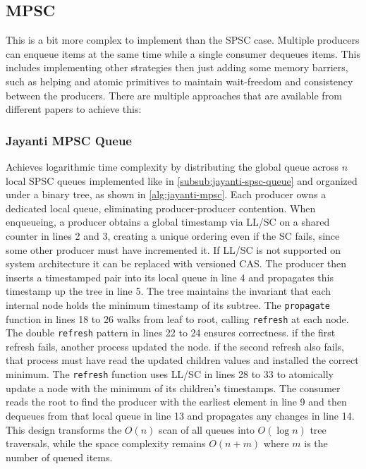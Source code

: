 \subsection{\acf{MPSC}}\label{subsec:multiple-producer-and-single-consumer}
This is a bit more complex to implement than the \ac{SPSC} case. Multiple producers can enqueue items at the same time while a single consumer dequeues items. This includes implementing other strategies then just adding some memory barriers, such as helping and atomic primitives to maintain wait-freedom and consistency between the producers. There are multiple approaches that are available from different papers to achieve this:

\subsubsection{Jayanti \ac{MPSC} Queue}\label{subsub:jayanti-mpsc-queue}
Achieves logarithmic time complexity by distributing the global queue across $n$ local \ac{SPSC} queues implemented like in \cref{subsub:jayanti-spsc-queue} and organized under a binary tree, as shown in \cref{alg:jayanti-mpsc}. Each producer owns a dedicated local queue, eliminating producer-producer contention. When enqueueing, a producer obtains a global timestamp via \ac{LL/SC} on a shared counter in lines 2 and 3, creating a unique ordering even if the \ac{SC} fails, since some other producer must have incremented it. If \ac{LL/SC} is not supported on system architecture it can be replaced with versioned \ac{CAS}. The producer then inserts a timestamped pair into its local queue in line 4 and propagates this timestamp up the tree in line 5. The tree maintains the invariant that each internal node holds the minimum timestamp of its subtree. The \texttt{propagate} function in lines 18 to 26 walks from leaf to root, calling \texttt{refresh} at each node. The double \texttt{refresh} pattern in lines 22 to 24 ensures correctness. if the first refresh fails, another process updated the node. if the second refresh also fails, that process must have read the updated children values and installed the correct minimum. The \texttt{refresh} function uses \ac{LL/SC} in lines 28 to 33 to atomically update a node with the minimum of its children's timestamps. The consumer reads the root to find the producer with the earliest element in line 9 and then dequeues from that local queue in line 13 and propagates any changes in line 14. This design transforms the $O(n)$ scan of all queues into $O(\log n)$ tree traversals, while the space complexity remains $O(n + m)$ where $m$ is the number of queued items. \cite{JayantiLog}

